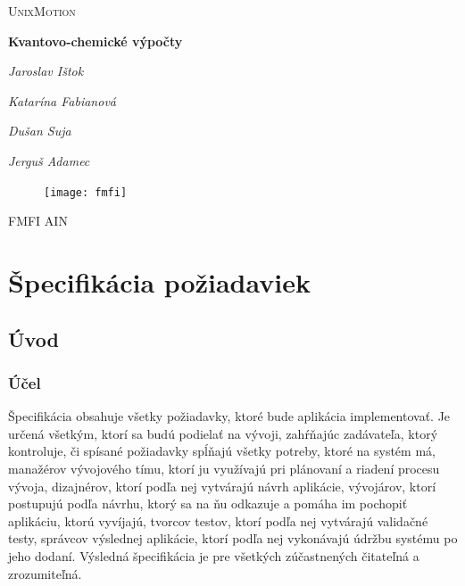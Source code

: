 \documentclass[12pt,a4paper]{article}
\begin{document}
	
\begin{titlepage}
	\centering
	\vspace{1cm}
	{\scshape\LARGE UnixMotion} \par
	\vspace{1cm}
	{\huge\bfseries Kvantovo-chemické výpočty} \par
	\vspace{2cm}
	{\Large\itshape Jaroslav Ištok \par}
	{\Large\itshape Katarína Fabianová \par}
	{\Large\itshape Dušan Suja \par}
	{\Large\itshape Jerguš Adamec \par}
	\vfill
	\begin{figure}[H]
		\centering
		\texttt{[image: fmfi]}
	\end{figure}
	\vspace{2cm}
	{\large FMFI AIN}
\end{titlepage}

\pagebreak

\tableofcontents
\vspace{2cm}
\listoffigures

\pagebreak

\section{Špecifikácia požiadaviek}

\subsection{Úvod}

\subsubsection{Účel}
Špecifikácia obsahuje všetky požiadavky, ktoré bude aplikácia implementovať. Je určená všetkým, ktorí sa budú podielať na vývoji, zahŕňajúc zadávateľa, ktorý kontroluje, či spísané požiadavky spĺňajú všetky potreby, ktoré na systém má, manažérov vývojového tímu, ktorí ju využívajú pri plánovaní a riadení procesu vývoja, dizajnérov, ktorí podľa nej vytvárajú návrh aplikácie, vývojárov, ktorí postupujú podľa návrhu, ktorý sa na ňu odkazuje a pomáha im pochopiť aplikáciu, ktorú vyvíjajú, tvorcov testov, ktorí podľa nej vytvárajú validačné testy, správcov výslednej aplikácie, ktorí podľa nej vykonávajú údržbu systému po jeho dodaní. Výsledná špecifikácia je pre všetkých zúčastnených čitateľná a zrozumiteľná.
\end{document}
